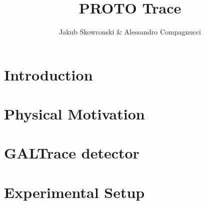 \documentclass[a4paper, 11pt]{article}
\author{Jakub Skowronski \& Alessandro Compagnucci}
\title{PROTO Trace}
\begin{document}
\maketitle

\section{Introduction}



\clearpage

\section{Physical Motivation}



\clearpage

\section{GALTrace detector}



\clearpage

\section{Experimental Setup}




\end{document}
